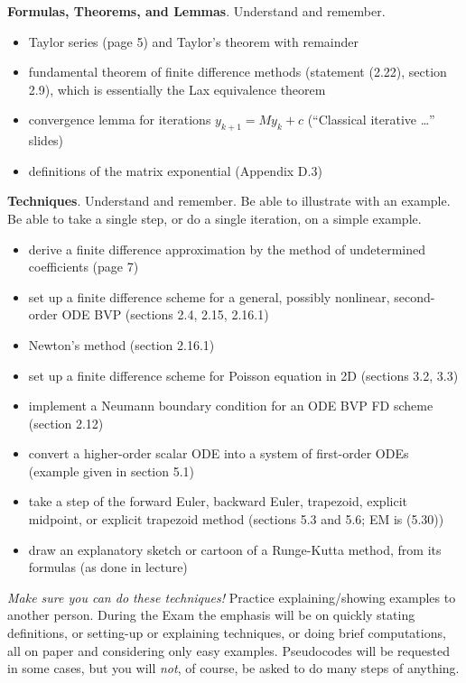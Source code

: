 \documentclass[12pt]{amsart}
\begin{document}
\bigskip

\noindent \textbf{Formulas, Theorems, and Lemmas}.  Understand and remember.
\begin{itemize}
\item Taylor series (page 5) and Taylor's theorem with remainder
\item fundamental theorem of finite difference methods (statement (2.22), section 2.9), which is essentially the Lax equivalence theorem
\item convergence lemma for iterations $y_{k+1} = M y_k + c$ (``Classical iterative \dots'' slides)
\item definitions of the matrix exponential (Appendix D.3)
\end{itemize}

\bigskip

\noindent \textbf{Techniques}.  Understand and remember.  Be able to illustrate with an example.  Be able to take a single step, or do a single iteration, on a simple example.
\begin{itemize}
\item derive a finite difference approximation by the method of undetermined coefficients (page 7)
\item set up a finite difference scheme for a general, possibly nonlinear, second-order ODE BVP (sections 2.4, 2.15, 2.16.1)
\item Newton's method (section 2.16.1)
\item set up a finite difference scheme for Poisson equation in 2D (sections 3.2, 3.3)
\item implement a Neumann boundary condition for an ODE BVP FD scheme (section 2.12)
\item convert a higher-order scalar ODE into a system of first-order ODEs (example given in section 5.1)
\item take a step of the forward Euler, backward Euler, trapezoid, explicit midpoint, or explicit trapezoid method (sections 5.3 and 5.6; EM is (5.30))
\item draw an explanatory sketch or cartoon of a Runge-Kutta method, from its formulas (as done in lecture)
\end{itemize}

\medskip
\noindent \emph{Make sure you can do these techniques!}  Practice explaining/showing examples to another person.  During the Exam the emphasis will be on quickly stating definitions, or setting-up or explaining techniques, or doing brief computations, all on paper and considering only easy examples.  Pseudocodes will be requested in some cases, but you will \emph{not}, of course, be asked to do many steps of anything.
\vfill
\end{document}
